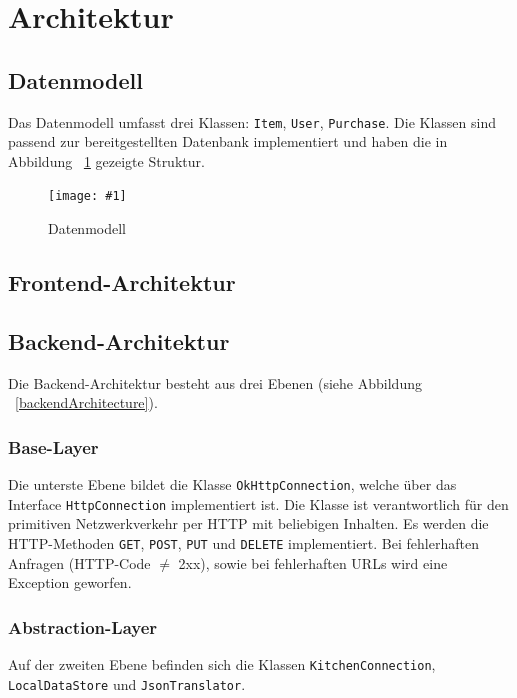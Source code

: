 \documentclass{scrartcl}
\newcommand{\cfigure}[3]{%
\begin{figure}[ht]
	\centering
	\texttt{[image: \#1]}
	\caption{#2}{#3} %
\end{figure}
}
\begin{document}
	\section{Architektur}\label{sec:architecture}

	\subsection{Datenmodell}\label{subsec:datamodel}

	Das Datenmodell umfasst drei Klassen: \texttt{Item}, \texttt{User}, \texttt{Purchase}.
	Die Klassen sind passend zur bereitgestellten Datenbank implementiert und haben die in Abbildung ~\ref{datamodel} gezeigte Struktur.

	\cfigure{figures/datamodel.png}{Datenmodell}{\label{datamodel}}

	\subsection{Frontend-Architektur}\label{subsec:frontend}

	\subsection{Backend-Architektur}\label{subsec:backend}

	Die Backend-Architektur besteht aus drei Ebenen (siehe Abbildung ~\ref{backendArchitecture}).

	\subsubsection{Base-Layer}

	Die unterste Ebene bildet die Klasse \texttt{OkHttpConnection}, welche über das Interface \texttt{HttpConnection} implementiert ist.
	Die Klasse ist verantwortlich für den primitiven Netzwerkverkehr per HTTP mit beliebigen Inhalten.
	Es werden die HTTP-Methoden \texttt{GET}, \texttt{POST}, \texttt{PUT} und \texttt{DELETE} implementiert.
	Bei fehlerhaften Anfragen (HTTP-Code $\neq$ 2xx), sowie bei fehlerhaften URLs wird eine Exception geworfen.

	\subsubsection{Abstraction-Layer}

	Auf der zweiten Ebene befinden sich die Klassen \texttt{KitchenConnection}, \texttt{LocalDataStore} und \texttt{JsonTranslator}.
\end{document}
